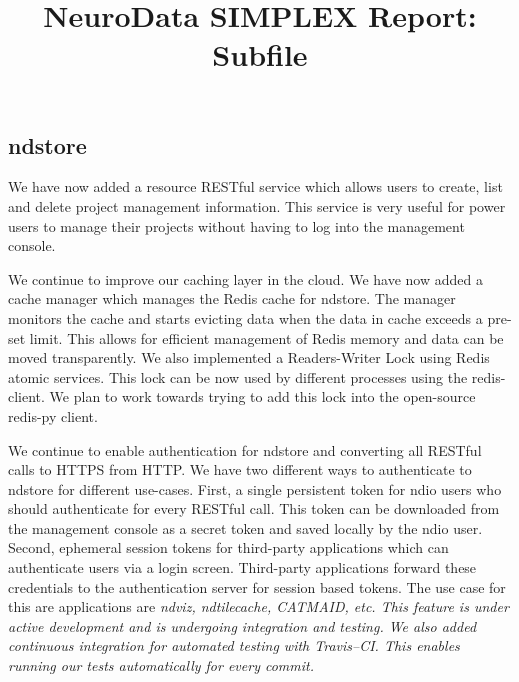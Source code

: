 \documentclass[simplex.tex]{subfiles}
\title{NeuroData SIMPLEX Report: Subfile}
\begin{document}

\subsection{ndstore}

We have now added a resource RESTful service which allows users to create, list and delete project management information. This service is very useful for power users to manage their projects without having to log into the management console.


We continue to improve our caching layer in the cloud. We have now added a cache manager which manages the Redis cache for ndstore. The manager monitors the cache and starts evicting data when the data in cache exceeds a pre-set limit. This allows for efficient management of Redis memory and data can be moved transparently. We also implemented a Readers-Writer Lock using Redis atomic services. This lock can be now used by different processes using the redis-client. We plan to work towards trying to add this lock into the open-source redis-py client.


We continue to enable authentication for ndstore and converting all RESTful calls to HTTPS from HTTP. We have two different ways to authenticate to ndstore for different use-cases. First, a single persistent token for ndio users who should authenticate for every RESTful call. This token can be downloaded from the management console as a secret token and saved locally by the ndio user. Second, ephemeral session tokens for third-party applications which can authenticate users via a login screen. Third-party applications forward these credentials to the authentication server for session based tokens. The use case for this are applications are \itshape{ndviz, ndtilecache, CATMAID,} etc. This feature is under active development and is undergoing integration and testing. We also added continuous integration for automated testing with Travis--CI. This enables running our tests automatically for every commit. 
\end{document}
